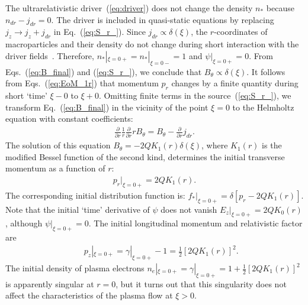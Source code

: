 \documentclass[twocolumn,showpacs,aip]{revtex4}
\begin{document}
The ultrarelativistic driver~(\ref{eq:driver})  does not change the density $n_*$ because $n_{dr}-j_{dr}=0$. The driver is included in quasi-static equations by replacing $j_z\rightarrow j_z+j_{dr}$ in Eq.~(\ref{eq:S_r_}). %
Since $j_{dr}\propto \delta(\xi)$,
the $r$-coordinates of macroparticles  and their density   do not change during short interaction with the driver fields~\cite{barov_energy_2004}.   Therefore, $n_*|_{\xi=0+}=n_*|_{\xi=0-}=1$ and $\psi|_{\xi=0+}=0$.  From Eqs.~(\ref{eq:B_final}) and (\ref{eq:S_r_}), we conclude that %
$B_{\theta}\propto \delta(\xi)$. 
 It follows from Eqs.~(\ref{eq:EoM_1r})  that  momentum $p_r$  changes by a finite quantity during short `time'  $\xi-0$ to $\xi+0$.  Omitting  finite terms in the source~(\ref{eq:S_r_}),    we transform Eq.~(\ref{eq:B_final}) in the vicinity of the point $\xi=0$  to the Helmholtz equation with constant coefficients:
\begin{eqnarray}
\frac{\partial}{\partial r}\frac{1}{r} \frac{\partial}{\partial r}rB_{\theta}=B_{\theta}-\frac{\partial}{\partial r}j_{dr}. 
\label{eq:B_r_t_}
\end{eqnarray}
The  solution of this equation
$
B_{\theta}=-2QK_1(r)\delta(\xi) 
$, where $K_1(r)$ is the modified Bessel function of the second kind,
 determines the  initial transverse momentum  as a function of $r$:  
\begin{eqnarray} 
p_r|_{\xi=0+}=2Q K_1(r).
\label{eq:init_pr_}
\end{eqnarray}
 The corresponding   initial distribution function is: $f_*|_{\xi=0+}=\delta[p_r-2QK_1(r)]$. Note that  the initial `time' derivative of $\psi$ does not vanish $E_z|_{\xi=0+}=2QK_0(r)$, although $\psi|_{\xi=0+}=0$.    
	The initial longitudinal momentum and relativistic factor  are
\begin{eqnarray}
&&p_z|_{\xi=0+}=\gamma|_{\xi=0+}-1=\frac{1}{2}[2Q K_1(r)]^2.\label{eq:init_pz}
\end{eqnarray}
The initial  density of plasma electrons $n_e|_{\xi=0+}=\gamma|_{\xi=0+}=1+\frac{1}{2}[2Q K_1(r)]^2$ is apparently singular at $r=0$, but it turns out that   this  singularity does not affect  the characteristics of the plasma flow at $\xi>0$.
\end{document}
